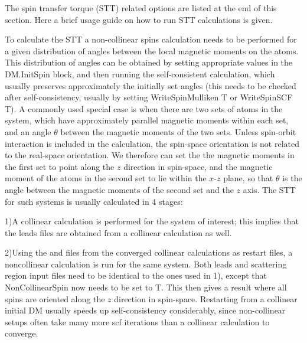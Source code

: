 \documentclass[11pt]{article}
\begin{document}
{The spin transfer torque (STT) related options are listed at the end of this section. Here a brief usage guide on how to run STT calculations is given.

To calculate the STT a non-collinear spins calculation needs to be performed for a given distribution of angles between the local magnetic moments on the atoms. This distribution of angles can be obtained by setting appropriate values in the DM.InitSpin block, and then running the self-consistent calculation, which usually preserves approximately the initially set angles (this needs to be checked after self-consistency, usually by setting WriteSpinMulliken T or WriteSpinSCF T). A commonly used special case is when there are two sets of atoms in the system, which have approximately parallel magnetic moments within each set, and an angle $\theta$ between the magnetic moments of the two sets. Unless spin-orbit interaction is included in the calculation, the spin-space orientation is not related to the real-space orientation. We therefore can set the the magnetic moments in the first set to point along the $z$ direction in spin-space, and the magnetic moment of the atoms in the second set to lie within the $x$-$z$ plane, so that $\theta$ is the angle between the magnetic moments of the second set and the $z$ axis. The STT for such systems is usually calculated in 4 stages:

1)A collinear calculation is performed for the system of interest; this implies that the leads files are obtained from a collinear calculation as well.

2)Using the  and  files from the converged collinear calculations as restart files, a noncollinear calculation is run for the same system. Both leads and scattering region input files need to be identical to the ones used in 1), except that NonCollinearSpin now needs to be set to T. This then gives a result where all spins are oriented along the $z$ direction in spin-space. Restarting from a collinear initial DM usually speeds up self-consistency considerably, since non-collinear setups often take many more scf iterations than a collinear calculation to converge.

}
\end{document}
